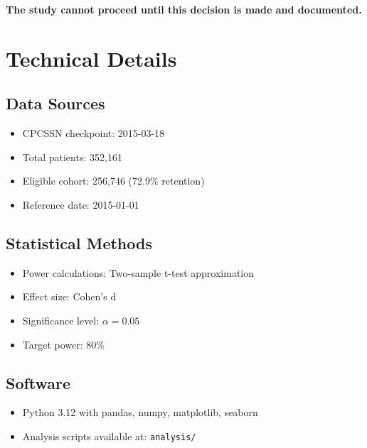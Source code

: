 \documentclass[11pt]{article}
\begin{document}
\textcolor{alertred}{\textbf{The study cannot proceed until this decision is made and documented.}}

\appendix

\section{Technical Details}

\subsection{Data Sources}
\begin{itemize}
    \item CPCSSN checkpoint: 2015-03-18
    \item Total patients: 352,161
    \item Eligible cohort: 256,746 (72.9\% retention)
    \item Reference date: 2015-01-01
\end{itemize}

\subsection{Statistical Methods}
\begin{itemize}
    \item Power calculations: Two-sample t-test approximation
    \item Effect size: Cohen's d
    \item Significance level: $\alpha = 0.05$
    \item Target power: 80\%
\end{itemize}

\subsection{Software}
\begin{itemize}
    \item Python 3.12 with pandas, numpy, matplotlib, seaborn
    \item Analysis scripts available at: \texttt{analysis/}
\end{itemize}
\end{document}
